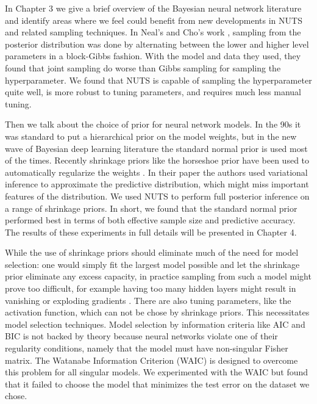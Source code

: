 \documentclass[12pt]{report}
\begin{document}
In Chapter 3 we give a brief overview of the Bayesian neural network literature and identify areas where we feel could benefit from new developments in NUTS and related sampling techniques. In Neal's and Cho's work \cite{neal1993bayesian,choo2000learning}, sampling from the posterior distribution was done by alternating between the lower and higher level parameters in a block-Gibbs fashion. With the model and data they used, they found that joint sampling do worse than Gibbs sampling for sampling the hyperparameter. We found that NUTS is capable of sampling the hyperparameter quite well, is more robust to tuning parameters, and requires much less manual tuning. 

Then we talk about the choice of prior for neural network models. In the 90s it was standard to put a hierarchical prior on the model weights, but in the new wave of Bayesian deep learning literature the standard normal prior is used most of the times. Recently shrinkage priors like the horseshoe prior have been used to automatically regularize the weights \cite{ghosh2017model}. In their paper the authors used variational inference to approximate the predictive distribution, which might miss important features of the  distribution. We used NUTS to perform full posterior inference on a range of shrinkage priors. In short, we found that the standard normal prior performed best in terms of both effective sample size and predictive accuracy. The results of these experiments in full details will be presented in Chapter 4.

While the use of shrinkage priors should eliminate much of the need for model selection: one would simply fit the largest model possible and let the shrinkage prior eliminate any excess capacity, in practice sampling from such a model might prove too difficult, for example having too many hidden layers might result in vanishing or exploding gradients \cite{bengio1994learning}. There are also tuning parameters, like the activation function, which can not be chose by shrinkage priors. This necessitates model selection techniques. Model selection by information criteria like AIC and BIC is not backed by theory because neural networks violate one of their regularity conditions, namely that the model must have non-singular Fisher matrix. The Watanabe Information Criterion (WAIC) is designed to overcome this problem for all singular models. We experimented with the WAIC but found that it failed to choose the model that minimizes the test error on the dataset we chose. 
\end{document}
